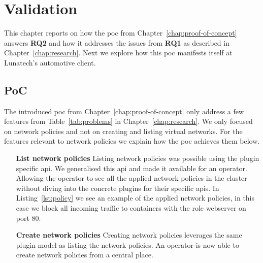 \chapter{Validation}
\label{chap:validation}
This chapter reports on how the \gls{poc} from Chapter~\ref{chap:proof-of-concept} answers \textbf{RQ2} and how it addresses the issues from \textbf{RQ1} as described in Chapter~\ref{chap:research}. Next we explore how this \gls{poc} manifests itself at Lunatech's automotive client.

\section{PoC}
The introduced \gls{poc} from Chapter~\ref{chap:proof-of-concept} only address a few features from Table~\ref{tab:problems} in Chapter~\ref{chap:research}. We only focused on network policies and not on creating and listing virtual networks. For the features relevant to network policies we explain how the \gls{poc} achieves them below.
\begin{itemize}
    \item[\textbf{List network policies}] Listing network policies was possible using the plugin specific \gls{api}. We generalised this \gls{api} and made it available for an operator. Allowing the operator to see all the applied network policies in the cluster without diving into the concrete plugins for their specific \glspl{api}. In Listing~\ref{lst:policy} we see an example of the applied network policies, in this case we block all incoming traffic to containers with the role webserver on port 80.
    \item[\textbf{Create network policies}] Creating network policies leverages the same plugin model as listing the network policies. An operator is now able to create network policies from a central place.
\end{itemize}

